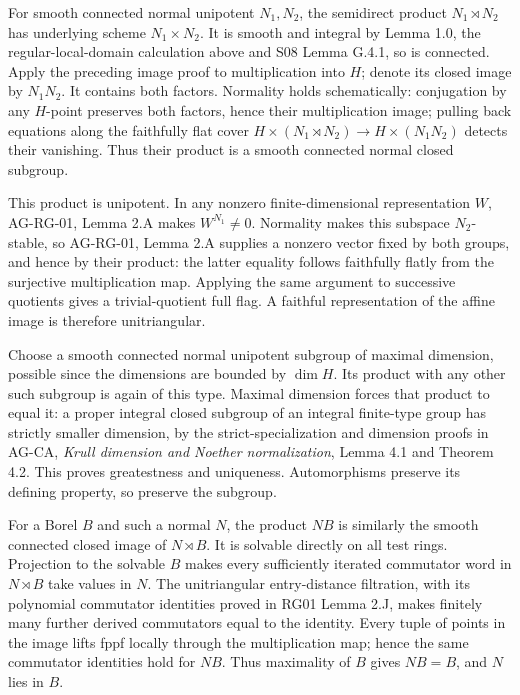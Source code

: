 \documentclass[11pt,a4paper,openany]{report}
\begin{document}
For smooth connected normal unipotent \(N_1,N_2\), the semidirect product \(N_1\rtimes N_2\) has underlying scheme \(N_1\times N_2\). It is smooth and integral by Lemma 1.0, the regular-local-domain calculation above and S08 Lemma G.4.1, so is connected. Apply the preceding image proof to multiplication into \(H\); denote its closed image by \(N_1N_2\). It contains both factors. Normality holds schematically: conjugation by any \(H\)-point preserves both factors, hence their multiplication image; pulling back equations along the faithfully flat cover \(H\times(N_1\rtimes N_2)\to H\times(N_1N_2)\) detects their vanishing. Thus their product is a smooth connected normal closed subgroup.

This product is unipotent. In any nonzero finite-dimensional representation \(W\), AG-RG-01, Lemma 2.A makes \(W^{N_1}\ne0\). Normality makes this subspace \(N_2\)-stable, so AG-RG-01, Lemma 2.A supplies a nonzero vector fixed by both groups, and hence by their product: the latter equality follows faithfully flatly from the surjective multiplication map. Applying the same argument to successive quotients gives a trivial-quotient full flag. A faithful representation of the affine image is therefore unitriangular.

Choose a smooth connected normal unipotent subgroup of maximal dimension, possible since the dimensions are bounded by \(\dim H\). Its product with any other such subgroup is again of this type. Maximal dimension forces that product to equal it: a proper integral closed subgroup of an integral finite-type group has strictly smaller dimension, by the strict-specialization and dimension proofs in AG-CA, \emph{Krull dimension and Noether normalization}, Lemma 4.1 and Theorem 4.2. This proves greatestness and uniqueness. Automorphisms preserve its defining property, so preserve the subgroup.

For a Borel \(B\) and such a normal \(N\), the product \(NB\) is similarly the smooth connected closed image of \(N\rtimes B\). It is solvable directly on all test rings. Projection to the solvable \(B\) makes every sufficiently iterated commutator word in \(N\rtimes B\) take values in \(N\). The unitriangular entry-distance filtration, with its polynomial commutator identities proved in RG01 Lemma 2.J, makes finitely many further derived commutators equal to the identity. Every tuple of points in the image lifts fppf locally through the multiplication map; hence the same commutator identities hold for \(NB\). Thus maximality of \(B\) gives \(NB=B\), and \(N\) lies in \(B\).
\end{document}
